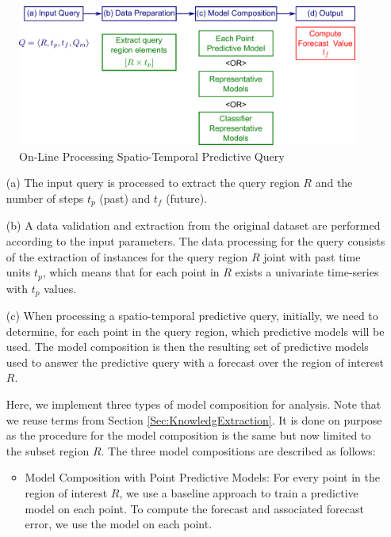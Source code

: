 \begin{figure}[h]
	\centering
	\includegraphics[scale=0.35]{../Figures/Query_Processing}
	\caption{On-Line Processing Spatio-Temporal Predictive Query}
	\label{Fig:OnLineQP}
\end{figure}

\begin{itemize}
 \item [(a)] The input query is processed to extract the query region $R$ and the number of steps $t_p$ (past) and $t_f$ (future).
 \item [(b)] A data validation and extraction from the original dataset are performed according to the input parameters. The data processing for the query consists of the extraction of instances for the query region $R$ joint with past time units $t_{p}$, which means that for each point in $R$ exists a univariate time-series with $t_{p}$ values.
 \item [(c)] When processing a spatio-temporal predictive query, initially, we need to determine, for each point in the query region, which predictive models will be used. The model composition is then the resulting set of predictive models used to answer the predictive query with a forecast over the region of interest $R$. 
 
 Here, we implement three types of model composition for analysis. Note that we reuse terms from Section \ref{Sec:KnowledgExtraction}. It is done on purpose as the procedure for the model composition is the same but now limited to the subset region $R$. The three model compositions are described as follows:

 \begin{itemize}
	\item Model Composition with Point Predictive Models: For every point in the region of interest $R$, we use a baseline approach to train a predictive model on each point. To compute the forecast and associated forecast error, we use the model on each point.


\end{itemize}
\end{itemize}
